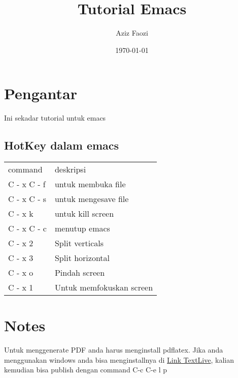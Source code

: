 \documentclass[11pt]{article}
\author{Aziz Faozi}
\date{\today}
\title{Tutorial Emacs}
\begin{document}
\maketitle
\tableofcontents



\section{Pengantar}
\label{sec:org24b4503}
Ini sekadar tutorial untuk emacs

\subsection{HotKey dalam emacs}
\label{sec:org6798ba4}
\begin{center}
\begin{tabular}{ll}
command & deskripsi\\
C - x C - f & untuk membuka file\\
C - x C - s & untuk mengesave file\\
C - x k & untuk kill screen\\
C - x C - c & menutup emacs\\
C - x 2 & Split verticals\\
C - x 3 & Split horizontal\\
C - x o & Pindah screen\\
C - x 1 & Untuk memfokuskan screen\\
\end{tabular}
\end{center}




\section{Notes}
\label{sec:org2307bfc}
Untuk menggenerate PDF anda harus menginstall pdflatex. Jika anda menggunakan windows anda bisa menginstallnya di
\href{https://mirror.ctan.org/systems/texlive/tlnet/install-tl-windows.exe}{Link TextLive}, kalian kemudian bisa publish dengan command C-c C-e l p
\end{document}
